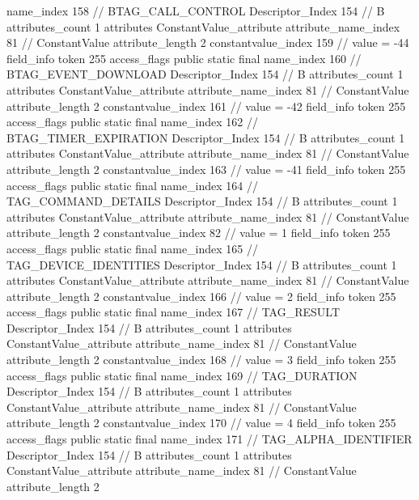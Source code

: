 {{{{{				name_index	158		// BTAG_CALL_CONTROL
				Descriptor_Index	154		// B
				attributes_count	1
				attributes {
				ConstantValue_attribute {
					attribute_name_index	81		// ConstantValue
					attribute_length	2
					constantvalue_index	159		// value = -44
				}
				}
			}
			field_info {
				token	255
				access_flags	public static final
				name_index	160		// BTAG_EVENT_DOWNLOAD
				Descriptor_Index	154		// B
				attributes_count	1
				attributes {
				ConstantValue_attribute {
					attribute_name_index	81		// ConstantValue
					attribute_length	2
					constantvalue_index	161		// value = -42
				}
				}
			}
			field_info {
				token	255
				access_flags	public static final
				name_index	162		// BTAG_TIMER_EXPIRATION
				Descriptor_Index	154		// B
				attributes_count	1
				attributes {
				ConstantValue_attribute {
					attribute_name_index	81		// ConstantValue
					attribute_length	2
					constantvalue_index	163		// value = -41
				}
				}
			}
			field_info {
				token	255
				access_flags	public static final
				name_index	164		// TAG_COMMAND_DETAILS
				Descriptor_Index	154		// B
				attributes_count	1
				attributes {
				ConstantValue_attribute {
					attribute_name_index	81		// ConstantValue
					attribute_length	2
					constantvalue_index	82		// value = 1
				}
				}
			}
			field_info {
				token	255
				access_flags	public static final
				name_index	165		// TAG_DEVICE_IDENTITIES
				Descriptor_Index	154		// B
				attributes_count	1
				attributes {
				ConstantValue_attribute {
					attribute_name_index	81		// ConstantValue
					attribute_length	2
					constantvalue_index	166		// value = 2
				}
				}
			}
			field_info {
				token	255
				access_flags	public static final
				name_index	167		// TAG_RESULT
				Descriptor_Index	154		// B
				attributes_count	1
				attributes {
				ConstantValue_attribute {
					attribute_name_index	81		// ConstantValue
					attribute_length	2
					constantvalue_index	168		// value = 3
				}
				}
			}
			field_info {
				token	255
				access_flags	public static final
				name_index	169		// TAG_DURATION
				Descriptor_Index	154		// B
				attributes_count	1
				attributes {
				ConstantValue_attribute {
					attribute_name_index	81		// ConstantValue
					attribute_length	2
					constantvalue_index	170		// value = 4
				}
				}
			}
			field_info {
				token	255
				access_flags	public static final
				name_index	171		// TAG_ALPHA_IDENTIFIER
				Descriptor_Index	154		// B
				attributes_count	1
				attributes {
				ConstantValue_attribute {
					attribute_name_index	81		// ConstantValue
					attribute_length	2
}}}}}}}
